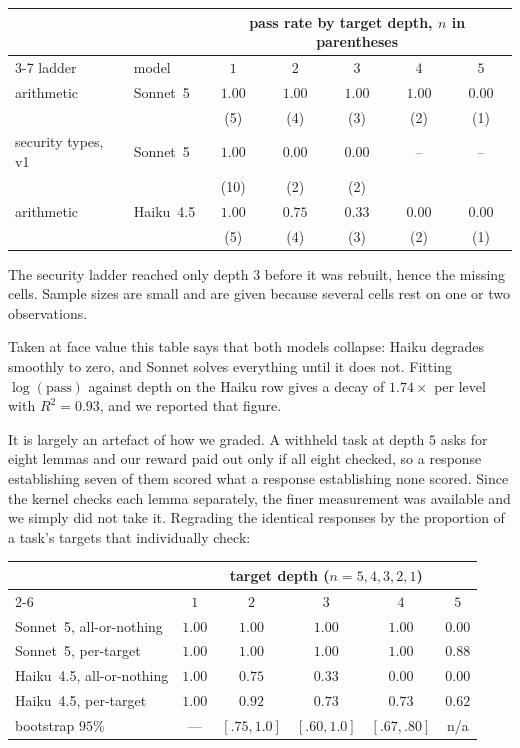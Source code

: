 \documentclass[11pt]{article}
\begin{document}
\begin{center}
\begin{tabular}{llccccc}
\toprule
& & \multicolumn{5}{c}{pass rate by target depth, $n$ in parentheses} \\
\cmidrule(l){3-7}
ladder & model & $1$ & $2$ & $3$ & $4$ & $5$ \\
\midrule
arithmetic & Sonnet~5 & $1.00$ & $1.00$ & $1.00$ & $1.00$ & $0.00$ \\
 & & \small(5) & \small(4) & \small(3) & \small(2) & \small(1) \\
security types, v1 & Sonnet~5 & $1.00$ & $0.00$ & $0.00$ & -- & -- \\
 & & \small(10) & \small(2) & \small(2) & & \\
arithmetic & Haiku~4.5 & $1.00$ & $0.75$ & $0.33$ & $0.00$ & $0.00$ \\
 & & \small(5) & \small(4) & \small(3) & \small(2) & \small(1) \\
\bottomrule
\end{tabular}
\end{center}

The security ladder reached only depth $3$ before it was rebuilt, hence the
missing cells. Sample sizes are small and are given because several cells rest
on one or two observations.

Taken at face value this table says that both models collapse: Haiku degrades
smoothly to zero, and Sonnet solves everything until it does not. Fitting
$\log(\text{pass})$ against depth on the Haiku row gives a decay of
$1.74\times$ per level with $R^2 = 0.93$, and we reported that figure.

It is largely an artefact of how we graded. A withheld task at depth $5$ asks
for eight lemmas and our reward paid out only if all eight checked, so a
response establishing seven of them scored what a response establishing none
scored. Since the kernel checks each lemma separately, the finer measurement was
available and we simply did not take it. Regrading the identical responses by the
proportion of a task's targets that individually check:

\begin{center}
\begin{tabular}{lccccc}
\toprule
& \multicolumn{5}{c}{target depth ($n = 5, 4, 3, 2, 1$)} \\
\cmidrule(l){2-6}
& $1$ & $2$ & $3$ & $4$ & $5$ \\
\midrule
Sonnet~5, all-or-nothing & $1.00$ & $1.00$ & $1.00$ & $1.00$ & $0.00$ \\
Sonnet~5, per-target     & $1.00$ & $1.00$ & $1.00$ & $1.00$ & $0.88$ \\
\midrule
Haiku~4.5, all-or-nothing & $1.00$ & $0.75$ & $0.33$ & $0.00$ & $0.00$ \\
Haiku~4.5, per-target     & $1.00$ & $0.92$ & $0.73$ & $0.73$ & $0.62$ \\
\quad bootstrap $95\%$ & --- & $[.75,1.0]$ & $[.60,1.0]$ & $[.67,.80]$ & n/a \\
\bottomrule
\end{tabular}
\end{center}
\end{document}
